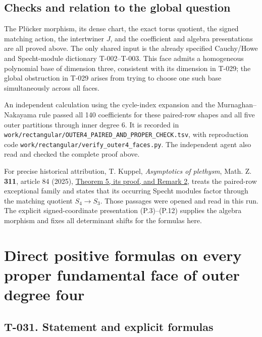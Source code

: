 \documentclass[
  10pt,
]{article}
\begin{document}
\subsection{Checks and relation to the global
question}\label{checks-and-relation-to-the-global-question}

The Plücker morphism, its dense chart, the exact torus quotient, the
signed matching action, the intertwiner \(J\), and the coefficient and
algebra presentations are all proved above. The only shared input is the
already specified Cauchy/Howe and Specht-module dictionary T-002--T-003.
This face admits a homogeneous polynomial base of dimension three,
consistent with its dimension in T-029; the global obstruction in T-029
arises from trying to choose one such base simultaneously across all
faces.

An independent calculation using the cycle-index expansion and the
Murnaghan--Nakayama rule passed all 140 coefficients for these
paired-row shapes and all five outer partitions through inner degree 6.
It is recorded in
\texttt{\small work/\allowbreak{}rectangular/\allowbreak{}OUTER4\_\allowbreak{}PAIRED\_\allowbreak{}AND\_\allowbreak{}PROPER\_\allowbreak{}CHECK.tsv},
with reproduction code
\texttt{\small work/\allowbreak{}rectangular/\allowbreak{}verify\_\allowbreak{}outer4\_\allowbreak{}faces.py}.
The independent agent also read and checked the complete proof above.

For precise historical attribution, T. Kuppel, \emph{Asymptotics of
plethysm}, Math. Z. \textbf{311}, article 84 (2025),
\href{https://link.springer.com/article/10.1007/s00209-025-03879-4}{Theorem
5, its proof, and Remark 2}, treats the paired-row exceptional family
and states that its occurring Specht modules factor through the matching
quotient \(S_4\to S_3\). Those passages were opened and read in this
run. The explicit signed-coordinate presentation (P.3)--(P.12) supplies
the algebra morphism and fixes all determinant shifts for the formulas
here.

\section{Direct positive formulas on every proper fundamental face of
outer degree
four}\label{direct-positive-formulas-on-every-proper-fundamental-face-of-outer-degree-four}

\subsection{T-031. Statement and explicit
formulas}\label{t-031.-statement-and-explicit-formulas}
\end{document}
